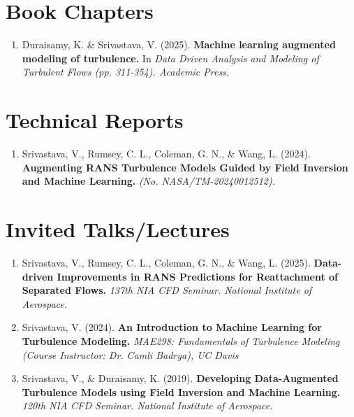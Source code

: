\documentclass[letterpaper, 11pt]{article}
\begin{document}
  \newpage


  \vspace*{0.25in}
  \section{Book Chapters}
  {
    \small
    \begin{enumerate}
      \item
      Duraisamy, K. \& Srivastava, V. (2025).%
      \textbf{
        Machine learning augmented modeling of turbulence.
      }In\textit{
        Data Driven Analysis and Modeling of Turbulent Flows (pp. 311-354). Academic Press.
      }
    \end{enumerate}
  }

  \section{Technical Reports}
  {
    \small
    \begin{enumerate}
      \item
      Srivastava, V., Rumsey, C. L., Coleman, G. N., \& Wang, L. (2024).%
      \textbf{
        Augmenting RANS Turbulence Models Guided by Field Inversion and Machine Learning.%
      }\textit{
        (No. NASA/TM-20240012512).
      }
    \end{enumerate}
  }

  \section{Invited Talks/Lectures}
  {
    \small
    \begin{enumerate}
      \item
      Srivastava, V., Rumsey, C. L., Coleman, G. N., \& Wang, L. (2025).%
      \textbf{
        Data-driven Improvements in RANS Predictions for Reattachment of Separated Flows.%
      }\textit{
        137th NIA CFD Seminar. National Institute of Aerospace.
      }

      \item
      Srivastava, V. (2024).%
      \textbf{
        An Introduction to Machine Learning for Turbulence Modeling.%
      }\textit{
        MAE298: Fundamentals of Turbulence Modeling (Course Instructor: Dr. Camli Badrya), UC Davis
      }

      \item
      Srivastava, V., \& Duraisamy, K. (2019).%
      \textbf{
        Developing Data-Augmented Turbulence Models using Field Inversion and Machine Learning.%
      }\textit{
        120th NIA CFD Seminar. National Institute of Aerospace.
      }
    \end{enumerate}
  }
\end{document}
